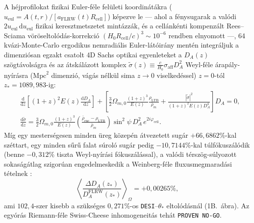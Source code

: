 \documentclass[11pt,a4paper]{article}
\begin{document}
A héjprofilokat fizikai Euler-féle felületi koordinátákra ($u_{\mathrm{eul}} = A(t,r)/[a_{\mathrm{FLRW}}(t)R_{\mathrm{cell}}]$) képezve le --- ahol a fénysugarak a valódi $2 u_{\mathrm{eul}}\,\mathrm{d}u_{\mathrm{eul}}$ fizikai keresztmetszetet mintázzák, és a cellánkénti kompenzált Rees--Sciama vöröseltolódás-korrekció $(H_0 R_{\mathrm{cell}}/c)^3 \sim 10^{-6}$ rendben elnyomott ---, 64 kvázi-Monte-Carlo ergodikus nemradiális Euler-látóirány mentén integráljuk a dimenziósan egzakt csatolt 4D Sachs optikai egyenleteket a $D_A(z)$ szögtávolságra és az átskálázott komplex $\tilde{\sigma}(z) \equiv \frac{c}{H_0}\sigma_{\mathrm{aff}} D_A^2$ Weyl-féle árapály-nyírásra ($\mathrm{Mpc}^2$ dimenzió, vágás nélkül sima $z \to 0$ viselkedéssel) $z = 0$-tól $z_* = 1089{,}983$-ig:
\begin{equation}
\begin{aligned}
    &\frac{\mathrm{d}}{\mathrm{d}z}\!\left[(1+z)^2 E(z)\frac{\mathrm{d}D_A}{\mathrm{d}z}\right] + \left[\frac{3}{2}\Omega_{m,0}\frac{(1+z)^3}{E(z)}\frac{\rho_{\mathrm{LTB}}}{\bar{\rho}_m} + \frac{|\tilde{\sigma}|^2}{(1+z)^2 E(z) D_A^4}\right] D_A = 0, \\
    &\frac{\mathrm{d}\tilde{\sigma}}{\mathrm{d}z} = \frac{3}{2}\Omega_{m,0}\frac{(1+z)^3}{E(z)}\left(\frac{\bar{\rho}_{\mathrm{enc}} - \rho_{\mathrm{LTB}}}{\bar{\rho}_m}\right)\sin^2\psi\, D_A^2\, e^{2i\varphi_{\mathrm{cell}}}.
\end{aligned}
\label{eq:ltb-sachs-hu}
\end{equation}
Míg egy mesterségesen minden üreg közepén átvezetett sugár $+66{,}6862\%$-kal széttart, egy minden sűrű falat súroló sugár pedig $-10{,}7144\%$-kal túlfókuszálódik (benne $-0{,}312\%$ tiszta Weyl-nyírási fókuszálással), a valódi térszög-súlyozott sokaságátlag szigorúan engedelmeskedik a Weinberg-féle fluxusmegmaradási tételnek \cite{Weinberg1976,KibbleLieu2005}:
\begin{equation}
    \left\langle\frac{\Delta D_A(z_*)}{D_A^{\mathrm{FLRW}}(z_*)}\right\rangle_{\!\Omega} = +0{,}00265\%,
    \label{eq:weinberg-result-hu}
\end{equation}
ami $102{,}4$-szer kisebb a szükséges $0{,}271\%$-os \texttt{DESI}--$\theta_*$ eltolódásnál (1B.~ábra). Az egyórás Riemann-féle Swiss-Cheese inhomogeneitás tehát \texttt{PROVEN NO-GO}.
\end{document}
